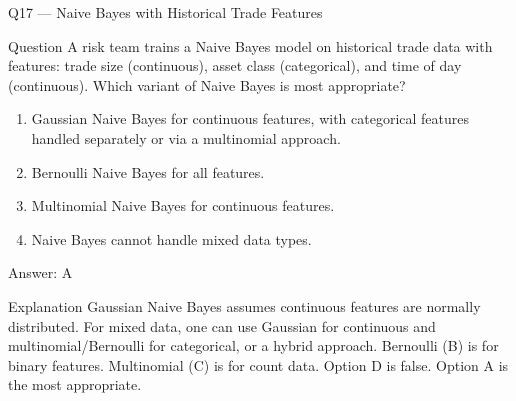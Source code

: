 \documentclass[aspectratio=169,8pt]{beamer}
\begin{document}
	\begin{frame}{Q17 --- Naive Bayes with Historical Trade Features}
		\begin{block}{Question}
			A risk team trains a Naive Bayes model on historical trade data with features: trade size (continuous), asset class (categorical), and time of day (continuous). Which variant of Naive Bayes is most appropriate?
			\begin{enumerate}
				\item Gaussian Naive Bayes for continuous features, with categorical features handled separately or via a multinomial approach.
				\item Bernoulli Naive Bayes for all features.
				\item Multinomial Naive Bayes for continuous features.
				\item Naive Bayes cannot handle mixed data types.
			\end{enumerate}
		\end{block}
		\begin{exampleblock}{Answer: A}\end{exampleblock}
		\begin{block}{Explanation}
			Gaussian Naive Bayes assumes continuous features are normally distributed. For mixed data, one can use Gaussian for continuous and multinomial/Bernoulli for categorical, or a hybrid approach. Bernoulli (B) is for binary features. Multinomial (C) is for count data. Option D is false. Option A is the most appropriate.
		\end{block}
	\end{frame}
	
\end{document}
